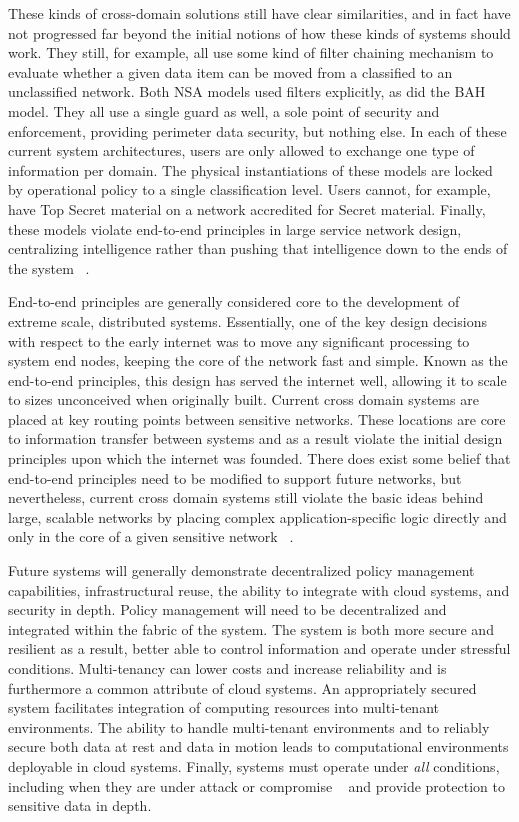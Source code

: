 These kinds of cross-domain solutions still have clear similarities, and in fact have not progressed far beyond the initial notions of how these kinds of systems should work.  They still, for example, all use some kind of filter chaining mechanism to evaluate whether a given data item can be moved from a classified to an unclassified network.  Both NSA models used filters explicitly, as did the BAH model.  They all use a single guard as well, a sole point of security and enforcement, providing perimeter data security, but nothing else.  In each of these current system architectures, users are only allowed to exchange one type of information per domain.  The physical instantiations of these models are locked by operational policy to a single classification level.  Users cannot, for example, have Top Secret material on a network accredited for Secret material.  Finally, these models violate end-to-end principles in large service network design, centralizing intelligence rather than pushing that intelligence down to the ends of the system ~\cite{Clark:1995:DPD:205447.205458}.

End-to-end principles are generally considered core to the development of extreme scale, distributed systems.  Essentially, one of the key design decisions with respect to the early internet was to move any significant processing to system end nodes, keeping the core of the network fast and simple.  Known as the end-to-end principles, this design has served the internet well, allowing it to scale to sizes unconceived when originally built.  Current cross domain systems are placed at key routing points between sensitive networks.  These locations are core to information transfer between systems and as a result violate the initial design principles upon which the internet was founded.  There does exist some belief that end-to-end principles need to be modified to support future networks, but nevertheless, current cross domain systems still violate the basic ideas behind large, scalable networks by placing complex application-specific logic directly and only in the core of a given sensitive network ~\cite{Blumenthal:2001:RDI:383034.383037}.

Future systems will generally demonstrate decentralized policy management capabilities, infrastructural reuse, the ability to integrate with cloud systems, and security in depth.  Policy management will need to be decentralized and integrated within the fabric of the system.  The system is both more secure and resilient as a result, better able to control information and operate under stressful conditions.  Multi-tenancy can lower costs and increase reliability and is furthermore a common attribute of cloud systems.  An appropriately secured system facilitates integration of computing resources into multi-tenant environments.  The ability to handle multi-tenant environments and to reliably secure both data at rest and data in motion leads to computational environments deployable in cloud systems.  Finally, systems must operate under \textit{all} conditions, including when they are under attack or compromise ~\cite{proposal:ron-ross} and provide protection to sensitive data in depth.
